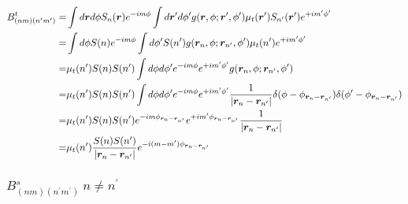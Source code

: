 \documentclass [10pt,letterpaper]{article}
\renewcommand{\vec}{\vectorsym}
\begin{document}
\begin{equation} \label{eq:result-Btnmnpmp-off-diagonal-1pt}
	\begin{split}
		B^t_{(n m)(n^\prime m^\prime)}
		=&
		\int d\vec{r} d\phi
		S_n(\vec{r})
		e^{-i m \phi}
		\int d\vec{r}^\prime d\phi^\prime
		g(\vec{r},\phi;\vec{r}^\prime,\phi^\prime)
		\mu_t(\vec{r}^\prime)
		S_{n^\prime}(\vec{r}^\prime)
		e^{+i m^\prime \phi^\prime}
		\\
		=&
		\int d\phi
		S(n)
		e^{-i m \phi}
		\int d\phi^\prime
		S(n^\prime)
		g(\vec{r}_n,\phi;\vec{r}_{n^\prime},\phi^\prime)
		\mu_t(n^\prime)
		e^{+i m^\prime \phi^\prime} 
		\\
		=& 
		\mu_t(n^\prime) S(n) S(n^\prime)
		\int d\phi d\phi^\prime
		e^{-i m \phi}
		e^{+i m^\prime \phi^\prime} 
		g(\vec{r}_n,\phi;\vec{r}_{n^\prime},\phi^\prime)
		\\
		=& 
		\mu_t(n^\prime) S(n) S(n^\prime)
		\int d\phi d\phi^\prime
		e^{-i m \phi}
		e^{+i m^\prime \phi^\prime} 
		\frac{1}{\lvert\vec{r}_n-\vec{r}_{n^\prime}\rvert}
		\delta(\phi-\phi_{\vec{r}_n-\vec{r}_{n^\prime}})
		\delta(\phi^\prime-\phi_{\vec{r}_n-\vec{r}_{n^\prime}})
		\\
		=& 
		\mu_t(n^\prime) S(n) S(n^\prime)
		e^{-i m \phi_{\vec{r}_n-\vec{r}_{n^\prime}}}
		e^{+i m^\prime \phi_{\vec{r}_n-\vec{r}_{n^\prime}}} 
		\frac{1}{\lvert\vec{r}_n-\vec{r}_{n^\prime}\rvert}
		\\
		=& 
		\mu_t(n^\prime) 
		\frac{S(n) S(n^\prime)}{\lvert\vec{r}_n-\vec{r}_{n^\prime}\rvert}
		e^{-i (m-m^\prime) \phi_{\vec{r}_n-\vec{r}_{n^\prime}}}
	\end{split}
\end{equation}

\subsubsection{$B^s_{(n m)(n^\prime m^\prime)} \ n\neq n^\prime$}
\label{subsub:Bsnmnpmp-off-diagonal}
\end{document}
